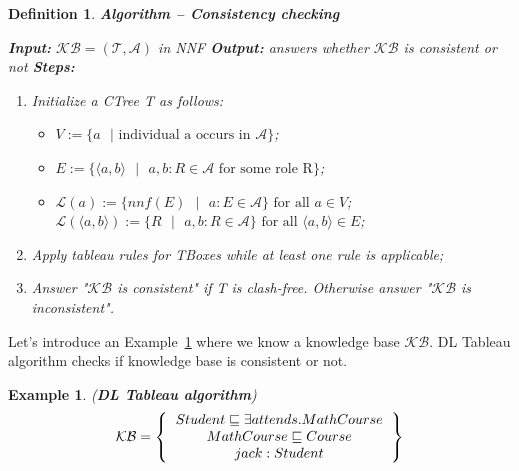 \documentclass[12pt,a4paper]{article}
\newtheorem{definition}{Definition}[subsection]
\newtheorem{example}{Example}[subsection]
\begin{document}
\begin{definition}{\textbf{Algorithm -- Consistency checking}}
	\label{def:consistency}

\textbf{Input:} $\mathcal{KB} = (\mathcal{T}, \mathcal{A})$ in NNF \newline
\indent \textbf{Output:} answers whether $\mathcal{KB}$ is consistent or not \newline
\indent \textbf{Steps:}
\begin{enumerate}
	\item Initialize a CTree T as follows:
		\begin{itemize}
			\item $V := \{ a \text{ } | \text{ individual a occurs in } \mathcal{A} \}$;
			\item $E := \{ \langle a,b \rangle \text{ } | \text{ } a,b : R \in \mathcal{A} \text{ for some role R} \}$;
			\item $\mathcal{L}(a) := \{ nnf(E) \text{ } | \text{ } a:E \in \mathcal{A}\} \text{ for all } a \in V$; \newline
			$\mathcal{L}(\langle a,b \rangle) := \{ R \text{ } | \text{ } a,b:R \in \mathcal{A}\} \text{ for all } \langle a,b \rangle \in E$;
		\end{itemize}
	\item Apply tableau rules for TBoxes while at least one rule is applicable;
	\item Answer "$\mathcal{KB}$ is consistent" if T is clash-free. Otherwise answer "$\mathcal{KB}$ is inconsistent".
\end{enumerate}

\end{definition}

Let's introduce an Example~\ref{example:dlTableau} where we know a knowledge base $\mathcal{KB}$. DL Tableau algorithm checks if knowledge base is consistent or not.

\begin{example}{(\textbf{DL Tableau algorithm})}
	\label{example:dlTableau}
	\[ 
	\mathcal{KB} = \left\{
	\begin{tabular}{c c}
	$Student \sqsubseteq \exists attends.MathCourse$ \\
	$MathCourse \sqsubseteq Course$ \\
	$jack : Student$ \\
	\end{tabular}
	\right \}
	\] \\
\end{example}
\end{document}
